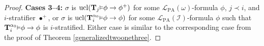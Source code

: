 \documentclass[reqno]{article}
\theoremstyle{definition}
\def\L{\mathscr{L}}
\def\M{\mathscr{M}}
\def\T{\mathbf{T}}
\def\U{\mathbf{U}}
\def\LPA{\L_{\mathrm{PA}}}
\def\indset{\mathcal I}
\def\Tr{\mathrm{Tr}}
\def\ctr{\cap\Tr}
\def\myequiv{\Rightarrow}
\renewcommand{\Pr}[1]{\T_{#1}\mbox{\small${\vDash}$}}
\newcommand{\Prr}[2]{\T^{#1}_{#2}\mbox{\small${\vDash}$}}
\newcommand{\ucl}[1]{\mathrm{ucl}(#1)}
\newcommand{\case}[1]{\textbf{Case #1:}}
\newcommand{\caseplural}[1]{\textbf{Cases #1:}}
\newcommand{\str}[1]{\mathrm{Str}(#1)} \newcommand{\Str}[1]{\str{#1}}
\begin{document}
\begin{proof}
%
%
%


\item
\caseplural{3--4}
$\sigma$ is $\ucl{\Pr j\phi\rightarrow\phi^+}$ for some $\LPA(\omega)$-formula $\phi$, $j\prec i$,
and $i$-stratifier $\bullet^+$, or $\sigma$
is $\ucl{\Prr{\alpha_0} i\phi\rightarrow\phi}$ for some $\LPA(\indset)$-formula $\phi$
such that $\Prr{\alpha_0}i\phi\rightarrow\phi$ is $i$-stratified.
Either case is similar to the corresponding case from the proof of Theorem \ref{generalizedtwoonethree}.


\end{proof}
\end{document}
